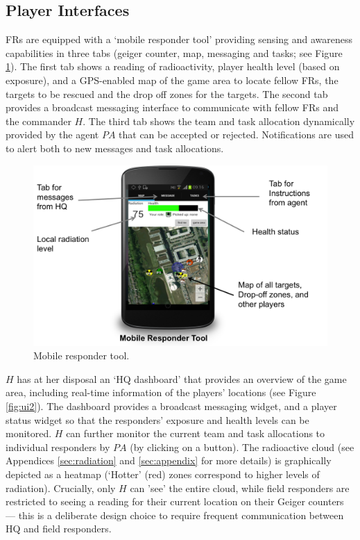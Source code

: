 \subsection{Player Interfaces}
\noindent FRs are equipped with a `mobile responder tool' providing sensing and awareness capabilities in three tabs (geiger cou\-nter, map, messaging and tasks; see Figure \ref{fig:ui}). The first tab shows a reading of radioactivity, player health level (based on exposure), and a GPS-enabled map of the game area to locate fellow FRs, the targets to be rescued and the drop off zones for the targets. The second tab provides a broadcast messaging interface to communicate with fellow FRs and the commander $H$. The third tab shows the team and task allocation dynamically provided by the agent $PA$ that can be accepted or rejected. Notifications are used to alert both to new messages and task allocations.

\begin{figure}[htbp]
\includegraphics[width=\columnwidth]{mobile_interface.png}
\caption{Mobile responder tool.}
\label{fig:ui}
\end{figure}



$H$ has at her disposal an `HQ dashboard' that provides an over\-view of the game area, including real-time information of the players' locations (see Figure \ref{fig:ui2}). The dashboard provides a broadcast messaging widget, and a player status widget so that the responders' exposure and health levels can be monitored. $H$ can further monitor the  current team and task allocations to individual responders by $PA$ (by clicking on a button). The radioactive cloud (see Appendices \ref{sec:radiation} and \ref{sec:appendix} for more details) is graphically depicted as a heatmap (`Hotter'  (red) zones correspond to higher levels of radiation). Crucially, only  $H$ can 'see' the entire cloud, while field responders are restricted to seeing a reading for their current location on their Geiger counters --- this is a deliberate design choice to require frequent communication between HQ and field responders. 

